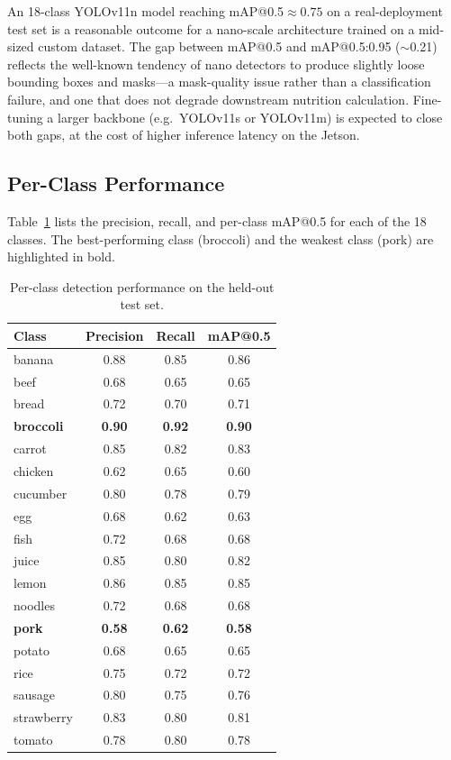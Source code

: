 \documentclass[11pt,a4paper]{article}
\begin{document}
An 18-class YOLOv11n model reaching mAP@0.5${}\approx 0.75$ on a real-deployment test set is a reasonable outcome for a nano-scale architecture trained on a mid-sized custom dataset. The gap between mAP@0.5 and mAP@0.5:0.95 ($\sim$0.21) reflects the well-known tendency of nano detectors to produce slightly loose bounding boxes and masks---a mask-quality issue rather than a classification failure, and one that does not degrade downstream nutrition calculation. Fine-tuning a larger backbone (e.g.\ YOLOv11s or YOLOv11m) is expected to close both gaps, at the cost of higher inference latency on the Jetson.

\subsection{Per-Class Performance}

Table~\ref{tab:perclass} lists the precision, recall, and per-class mAP@0.5 for each of the 18 classes. The best-performing class (broccoli) and the weakest class (pork) are highlighted in bold.

\begin{table}[H]
  \centering
  \caption{Per-class detection performance on the held-out test set.}
  \label{tab:perclass}
  \begin{tabular}{lccc}
    \toprule
    \textbf{Class} & \textbf{Precision} & \textbf{Recall} & \textbf{mAP@0.5} \\
    \midrule
    banana              & 0.88 & 0.85 & 0.86 \\
    beef                & 0.68 & 0.65 & 0.65 \\
    bread               & 0.72 & 0.70 & 0.71 \\
    \textbf{broccoli}   & \textbf{0.90} & \textbf{0.92} & \textbf{0.90} \\
    carrot              & 0.85 & 0.82 & 0.83 \\
    chicken             & 0.62 & 0.65 & 0.60 \\
    cucumber            & 0.80 & 0.78 & 0.79 \\
    egg                 & 0.68 & 0.62 & 0.63 \\
    fish                & 0.72 & 0.68 & 0.68 \\
    juice               & 0.85 & 0.80 & 0.82 \\
    lemon               & 0.86 & 0.85 & 0.85 \\
    noodles             & 0.72 & 0.68 & 0.68 \\
    \textbf{pork}       & \textbf{0.58} & \textbf{0.62} & \textbf{0.58} \\
    potato              & 0.68 & 0.65 & 0.65 \\
    rice                & 0.75 & 0.72 & 0.72 \\
    sausage             & 0.80 & 0.75 & 0.76 \\
    strawberry          & 0.83 & 0.80 & 0.81 \\
    tomato              & 0.78 & 0.80 & 0.78 \\
    \bottomrule
  \end{tabular}
\end{table}
\end{document}
